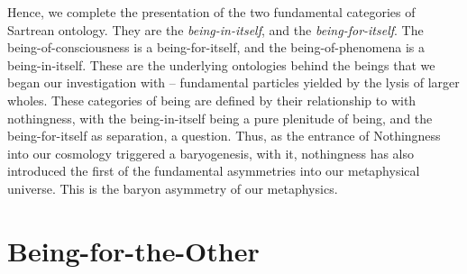 Hence, we complete the presentation of the two fundamental categories of Sartrean ontology. They are the \emph{being-in-itself}, and the \emph{being-for-itself}. The being-of-consciousness is a being-for-itself, and the being-of-phenomena is a being-in-itself. These are the underlying ontologies behind the beings that we began our investigation with -- fundamental particles yielded by the lysis of larger wholes. These categories of being are defined by their relationship to with nothingness, with the being-in-itself being a pure plenitude of being, and the being-for-itself as separation, a question. Thus, as the entrance of Nothingness into our cosmology triggered a baryogenesis, with it, nothingness has also introduced the first of the fundamental asymmetries into our metaphysical universe. This is the baryon asymmetry of our metaphysics.



\section{Being-for-the-Other}

